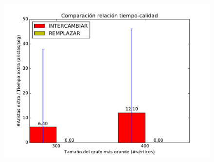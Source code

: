 \begin{figure}[H]
\begin{minipage}{0.49\textwidth}
  \centering
    \includegraphics[width=1\textwidth]{graficos/problema_5/cociente0-4.pdf}
  \caption{}
  \label{fig:5-cociente3}
\end{minipage}%

\end{figure}



